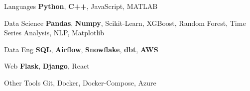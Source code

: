 
\begin{cvskills}
    \cvskill
    {Languages} %
    {{\textbf{Python}}, {\textbf{C++}}, JavaScript, MATLAB} %
    
    \cvskill
    {Data Science} %
    {{\textbf{Pandas}}, \textbf{Numpy}, Scikit-Learn, XGBoost, Random Forest, Time Series Analysis, NLP, Matplotlib}

    \cvskill
    {Data Eng} %
    {\textbf{SQL}, \textbf{Airflow}, \textbf{Snowflake}, \textbf{dbt}, \textbf{AWS}} %
    
    \cvskill
    {Web}
    {{\textbf{Flask}}, {\textbf{Django}}, React}%
    
    \cvskill
    {Other Tools}
    {Git, Docker, Docker-Compose, Azure}%
\end{cvskills}

